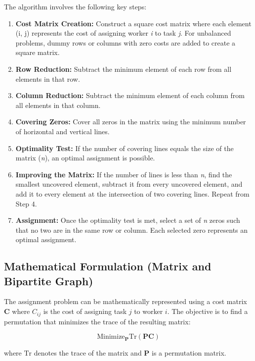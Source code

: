 \documentclass{article}
\begin{document}
The algorithm involves the following key steps:

\begin{enumerate}
    \item \textbf{Cost Matrix Creation:} Construct a square cost matrix where each element (i, j) represents the cost of assigning worker \textit{i} to task \textit{j}. For unbalanced problems, dummy rows or columns with zero costs are added to create a square matrix.
    \item \textbf{Row Reduction:} Subtract the minimum element of each row from all elements in that row.
    \item \textbf{Column Reduction:} Subtract the minimum element of each column from all elements in that column.
    \item \textbf{Covering Zeros:} Cover all zeros in the matrix using the minimum number of horizontal and vertical lines.
    \item \textbf{Optimality Test:} If the number of covering lines equals the size of the matrix (\textit{n}), an optimal assignment is possible.
    \item \textbf{Improving the Matrix:} If the number of lines is less than \textit{n}, find the smallest uncovered element, subtract it from every uncovered element, and add it to every element at the intersection of two covering lines. Repeat from Step 4.
    \item \textbf{Assignment:} Once the optimality test is met, select a set of \textit{n} zeros such that no two are in the same row or column. Each selected zero represents an optimal assignment.
\end{enumerate}

\subsection{Mathematical Formulation (Matrix and Bipartite Graph)}

The assignment problem can be mathematically represented using a cost matrix $\mathbf{C}$ where $C_{ij}$ is the cost of assigning task $j$ to worker $i$. The objective is to find a permutation that minimizes the trace of the resulting matrix:

\begin{equation}
\text{Minimize}_{\mathbf{P}} \text{Tr}(\mathbf{P}\mathbf{C})
\end{equation}

where $\text{Tr}$ denotes the trace of the matrix and $\mathbf{P}$ is a permutation matrix.
\end{document}

